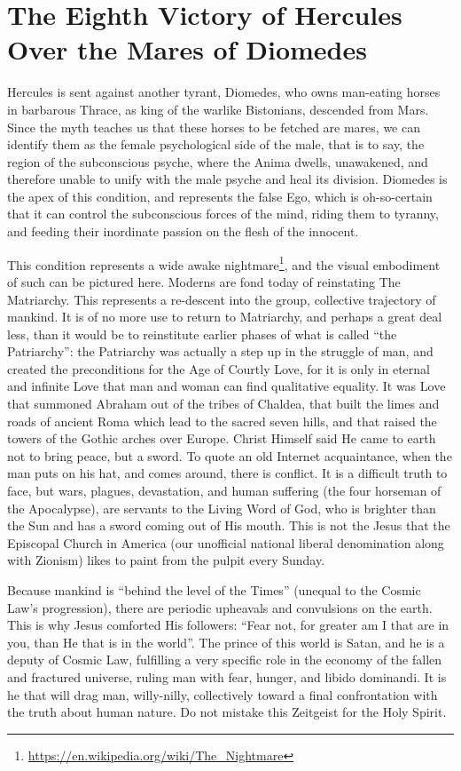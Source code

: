 \section{The Eighth Victory of Hercules Over the Mares of Diomedes}

Hercules is sent against another tyrant, Diomedes, who owns man-eating horses in barbarous Thrace, as king of the warlike Bistonians, descended from Mars. Since the myth teaches us that these horses to be fetched are mares, we can identify them as the female psychological side of the male, that is to say, the region of the subconscious psyche, where the Anima dwells, unawakened, and therefore unable to unify with the male psyche and heal its division. Diomedes is the apex of this condition, and represents the false Ego, which is oh-so-certain that it can control the subconscious forces of the mind, riding them to tyranny, and feeding their inordinate passion on the flesh of the innocent.

This condition represents a wide awake nightmare\footnote{\url{https://en.wikipedia.org/wiki/The_Nightmare}}, and the visual embodiment of such can be pictured here. Moderns are fond today of reinstating The Matriarchy. This represents a re-descent into the group, collective trajectory of mankind. It is of no more use to return to Matriarchy, and perhaps a great deal less, than it would be to reinstitute earlier phases of what is called ``the Patriarchy'': the Patriarchy was actually a step up in the struggle of man, and created the preconditions for the Age of Courtly Love, for it is only in eternal and infinite Love that man and woman can find qualitative equality. It was Love that summoned Abraham out of the tribes of Chaldea, that built the limes and roads of ancient Roma which lead to the sacred seven hills, and that raised the towers of the Gothic arches over Europe. Christ Himself said He came to earth not to bring peace, but a sword. To quote an old Internet acquaintance, when the man puts on his hat, and comes around, there is conflict. It is a difficult truth to face, but wars, plagues, devastation, and human suffering (the four horseman of the Apocalypse), are servants to the Living Word of God, who is brighter than the Sun and has a sword coming out of His mouth. This is not the Jesus that the Episcopal Church in America (our unofficial national liberal denomination along with Zionism) likes to paint from the pulpit every Sunday.

Because mankind is ``behind the level of the Times'' (unequal to the Cosmic Law's progression), there are periodic upheavals and convulsions on the earth. This is why Jesus comforted His followers: ``Fear not, for greater am I that are in you, than He that is in the world''. The prince of this world is Satan, and he is a deputy of Cosmic Law, fulfilling a very specific role in the economy of the fallen and fractured universe, ruling man with fear, hunger, and libido dominandi. It is he that will drag man, willy-nilly, collectively toward a final confrontation with the truth about human nature. Do not mistake this Zeitgeist for the Holy Spirit.

